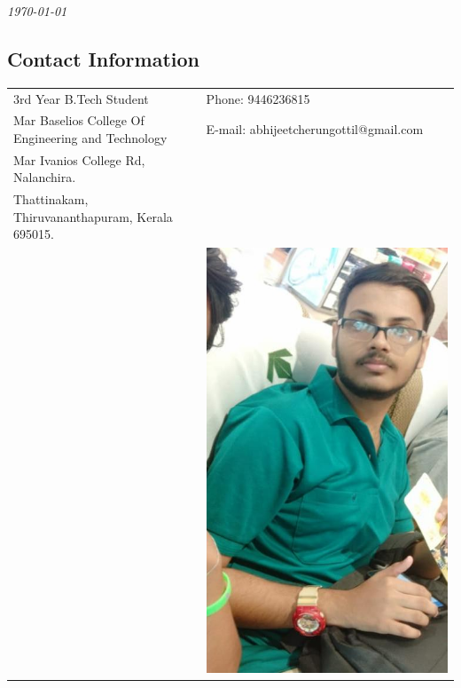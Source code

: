 \documentclass[margin,line]{res}
\begin{document}
	
	 \hfill {\em \today}
	
	\begin{resume}
		\section{\sc Contact Information}
		
		\vspace{.05in}
		\begin{tabular}{@{}p{3.5in}p{3in}}
			3rd  Year B.Tech Student                                                                     & {Phone:}  9446236815 \\
			Mar Baselios College Of Engineering
			and Technology 
			& {E-mail:}  abhijeetcherungottil@gmail.com\\
			Mar Ivanios College Rd, Nalanchira.\\
			Thattinakam, Thiruvananthapuram, Kerala 695015.\\ 
			&
			\includegraphics[width=0.15\textheight]{my}
			

\end{tabular}
\end{resume}
\end{document}
